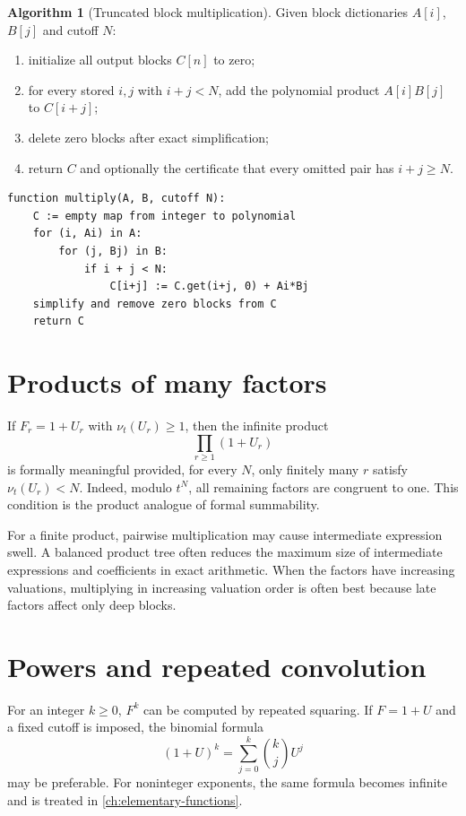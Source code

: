 \documentclass[11pt,openany]{book}
\theoremstyle{definition}
\newtheorem{algorithm}{Algorithm}[chapter]
\theoremstyle{plain}
\theoremstyle{remark}
\newcommand{\val}{\nu}
\begin{document}
\begin{algorithm}[Truncated block multiplication]\label{alg:multiply}
Given block dictionaries \(A[i]\), \(B[j]\) and cutoff \(N\):
\begin{enumerate}
\item initialize all output blocks \(C[n]\) to zero;
\item for every stored \(i,j\) with \(i+j<N\), add the polynomial product \(A[i]B[j]\) to \(C[i+j]\);
\item delete zero blocks after exact simplification;
\item return \(C\) and optionally the certificate that every omitted pair has \(i+j\ge N\).
\end{enumerate}
\end{algorithm}

\begin{lstlisting}[style=pseudo,caption={Sparse truncated multiplication}]
function multiply(A, B, cutoff N):
    C := empty map from integer to polynomial
    for (i, Ai) in A:
        for (j, Bj) in B:
            if i + j < N:
                C[i+j] := C.get(i+j, 0) + Ai*Bj
    simplify and remove zero blocks from C
    return C
\end{lstlisting}

\section{Products of many factors}
If \(F_r=1+U_r\) with \(\val_t(U_r)\ge1\), then the infinite product
\begin{equation}\label{eq:formal-infinite-product}
 \prod_{r\ge1}(1+U_r)
\end{equation}
is formally meaningful provided, for every \(N\), only finitely many \(r\) satisfy \(\val_t(U_r)<N\). Indeed, modulo \(t^N\), all remaining factors are congruent to one. This condition is the product analogue of formal summability.

For a finite product, pairwise multiplication may cause intermediate expression swell. A balanced product tree often reduces the maximum size of intermediate expressions and coefficients in exact arithmetic. When the factors have increasing valuations, multiplying in increasing valuation order is often best because late factors affect only deep blocks.

\section{Powers and repeated convolution}
For an integer \(k\ge0\), \(F^k\) can be computed by repeated squaring. If \(F=1+U\) and a fixed cutoff is imposed, the binomial formula
\begin{equation}\label{eq:integer-binomial}
 (1+U)^k=\sum_{j=0}^{k}\binom{k}{j}U^j
\end{equation}
may be preferable. For noninteger exponents, the same formula becomes infinite and is treated in \cref{ch:elementary-functions}.
\end{document}
